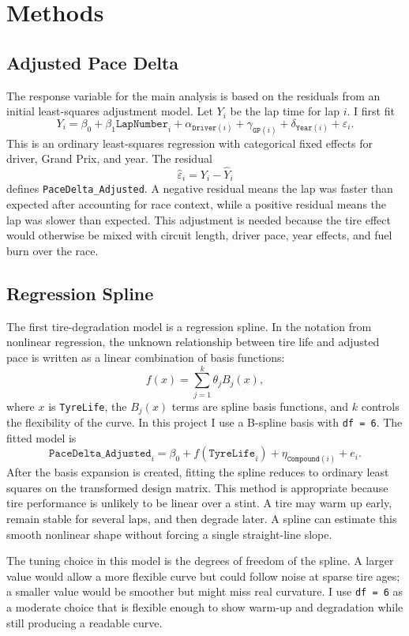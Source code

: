 \documentclass[11pt]{article}
\begin{document}
\section{Methods}

\subsection{Adjusted Pace Delta}

The response variable for the main analysis is based on the residuals from an initial least-squares adjustment model. Let $Y_i$ be the lap time for lap $i$. I first fit
\[
Y_i = \beta_0 + \beta_1\texttt{LapNumber}_i + \alpha_{\texttt{Driver}(i)} + \gamma_{\texttt{GP}(i)} + \delta_{\texttt{Year}(i)} + \varepsilon_i.
\]
This is an ordinary least-squares regression with categorical fixed effects for driver, Grand Prix, and year. The residual
\[
\widehat{\varepsilon}_i = Y_i - \widehat{Y}_i
\]
defines \texttt{PaceDelta\_Adjusted}. A negative residual means the lap was faster than expected after accounting for race context, while a positive residual means the lap was slower than expected. This adjustment is needed because the tire effect would otherwise be mixed with circuit length, driver pace, year effects, and fuel burn over the race.

\subsection{Regression Spline}

The first tire-degradation model is a regression spline. In the notation from nonlinear regression, the unknown relationship between tire life and adjusted pace is written as a linear combination of basis functions:
\[
f(x) = \sum_{j=1}^{k} \theta_j B_j(x),
\]
where $x$ is \texttt{TyreLife}, the $B_j(x)$ terms are spline basis functions, and $k$ controls the flexibility of the curve. In this project I use a B-spline basis with \texttt{df = 6}. The fitted model is
\[
\texttt{PaceDelta\_Adjusted}_i = \beta_0 + f(\texttt{TyreLife}_i) + \eta_{\texttt{Compound}(i)} + e_i.
\]
After the basis expansion is created, fitting the spline reduces to ordinary least squares on the transformed design matrix. This method is appropriate because tire performance is unlikely to be linear over a stint. A tire may warm up early, remain stable for several laps, and then degrade later. A spline can estimate this smooth nonlinear shape without forcing a single straight-line slope.

The tuning choice in this model is the degrees of freedom of the spline. A larger value would allow a more flexible curve but could follow noise at sparse tire ages; a smaller value would be smoother but might miss real curvature. I use \texttt{df = 6} as a moderate choice that is flexible enough to show warm-up and degradation while still producing a readable curve.
\end{document}
